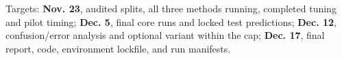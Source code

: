 \documentclass{article}
\begin{document}
Targets: \textbf{Nov. 23}, audited splits, all three methods running, completed tuning and pilot timing; \textbf{Dec. 5}, final core runs and locked test predictions; \textbf{Dec. 12}, confusion/error analysis and optional variant within the cap; \textbf{Dec. 17}, final report, code, environment lockfile, and run manifests.

\clearpage


\end{document}
